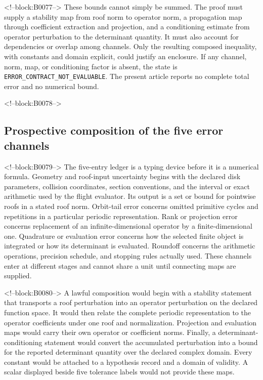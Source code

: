 \documentclass[11pt,a4paper]{article}
\begin{document}
<!--block:B0077-->
These bounds cannot simply be summed. The proof must supply a stability map from roof norm to operator norm, a propagation map through coefficient extraction and projection, and a conditioning estimate from operator perturbation to the determinant quantity. It must also account for dependencies or overlap among channels. Only the resulting composed inequality, with constants and domain explicit, could justify an enclosure. If any channel, norm, map, or conditioning factor is absent, the state is \texttt{ERROR\_CONTRACT\_NOT\_EVALUABLE}. The present article reports no complete total error and no numerical bound.

<!--block:B0078-->
\subsection{Prospective composition of the five error channels}

<!--block:B0079-->
The five-entry ledger is a typing device before it is a numerical formula. Geometry and roof-input uncertainty begins with the declared disk parameters, collision coordinates, section conventions, and the interval or exact arithmetic used by the flight evaluator. Its output is a set or bound for pointwise roofs in a stated roof norm. Orbit-tail error concerns omitted primitive cycles and repetitions in a particular periodic representation. Rank or projection error concerns replacement of an infinite-dimensional operator by a finite-dimensional one. Quadrature or evaluation error concerns how the selected finite object is integrated or how its determinant is evaluated. Roundoff concerns the arithmetic operations, precision schedule, and stopping rules actually used. These channels enter at different stages and cannot share a unit until connecting maps are supplied.

<!--block:B0080-->
A lawful composition would begin with a stability statement that transports a roof perturbation into an operator perturbation on the declared function space. It would then relate the complete periodic representation to the operator coefficients under one roof and normalization. Projection and evaluation maps would carry their own operator or coefficient norms. Finally, a determinant-conditioning statement would convert the accumulated perturbation into a bound for the reported determinant quantity over the declared complex domain. Every constant would be attached to a hypothesis record and a domain of validity. A scalar displayed beside five tolerance labels would not provide these maps.
\end{document}
